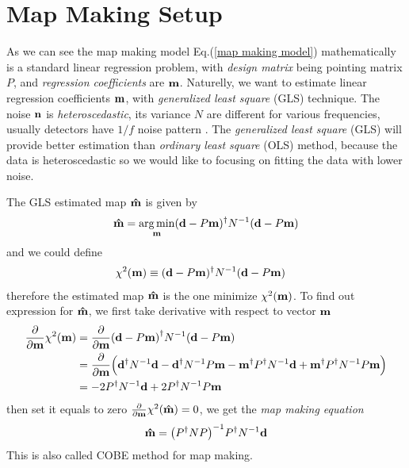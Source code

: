 \documentclass[11pt, letterpaper]{article}
\DeclareMathOperator*{\argmin}{arg\,min}
\newcommand{\vbd}{\vb{d}}
\newcommand{\vbm}{\vb{m}}
\newcommand{\vbn}{\vb{n}}
\newcommand{\inv}[1]{#1^{-1}}
\newcommand{\hatm}{\vb{\hat{m}}}
\newcommand{\Pdagger}{P^{\dagger}}
\newcommand{\PPinv}[1]{\inv{\qty(\Pdagger #1 P)}}
\begin{document}
\section{Map Making Setup}
As we can see the map making model Eq.(\ref{map making model}) mathematically 
is a standard linear regression problem,
with \textit{design matrix} being pointing matrix $P$, and \textit{regression
coefficients} are $\vbm$.
Naturelly, we want to estimate linear regression coefficients $\vbm$,
with \textit{generalized least square} (GLS) technique.
The noise $\vbn$ is \textit{heteroscedastic}, its variance $N$ are 
different for various frequencies, usually detectors have $1/f$ noise pattern
\cite{1997PhRvD..56.4514T}.
The \textit{generalized least square} (GLS) will provide better estimation 
than \textit{ordinary least square} (OLS) method, because the data is
heteroscedastic so we would like to focusing on fitting the data with lower 
noise.

The GLS estimated map $\hatm$ is given by
\begin{equation}
\hatm = \argmin_{\vbm} (\vbd - P\vbm)^{\dagger} N^{-1} (\vbd - P \vbm) 
\label{GLS estimator equation}
\end{equation}
and we could define 
\begin{align}
\chi^2(\vbm) & \equiv (\vbd - P\vbm)^{\dagger} N^{-1} (\vbd - P \vbm) 
\label{chi2 formula}
\end{align}
therefore the estimated map $\hatm$ is the one minimize $\chi^2(\vbm)$.
To find out expression for $\hatm$, we first take derivative with respect to 
vector $\vbm$
\begin{align}
\begin{aligned}[b]
\pdv{\vbm} \chi^2(\vbm)
&= \pdv{\vbm} (\vbd - P\vbm)^{\dagger} N^{-1} (\vbd - P \vbm)
\\
&= \pdv{\vbm} \qty\Big(
    \vbd^{\dagger} N^{-1} \vbd 
    - \vbd^{\dagger} N^{-1} P \vbm 
    - \vbm^{\dagger}\Pdagger N^{-1}\vbd 
    + \vbm^{\dagger} \Pdagger N^{-1}P\vbm
)
\\
&= -2\Pdagger N^{-1} \vbd + 2 \Pdagger N^{-1} P \vbm
\label{dchi2/dm}
\end{aligned}
\end{align}
then set it equals to zero $\pdv{\vbm} \chi^2(\hatm) = 0$,
we get the \textit{map making equation}
\begin{align}
\hatm = \PPinv{N} \Pdagger \inv{N} \vbd \label{map making equation}
\end{align}
This is also called COBE method for map making.
\end{document}
